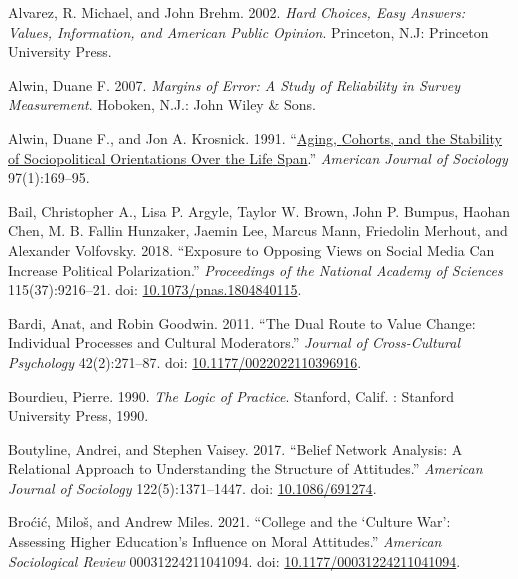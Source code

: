 \documentclass[
  11pt,
]{article}
\newlength{\cslhangindent}
\newlength{\cslentryspacingunit} %
\newenvironment{CSLReferences}[2] %
 {%
  \setlength{\parindent}{0pt}
  \ifodd #1
  \let\oldpar\par
  \def\par{\hangindent=\cslhangindent\oldpar}
  \fi
  \setlength{\parskip}{#2\cslentryspacingunit}
 }%
 {}
\begin{document}
\hypertarget{refs}{}
\begin{CSLReferences}{1}{0}
\leavevmode{}%
Alvarez, R. Michael, and John Brehm. 2002. \emph{Hard Choices, Easy
Answers: Values, Information, and {American} Public Opinion}. Princeton,
N.J: Princeton University Press.

\leavevmode{}%
Alwin, Duane F. 2007. \emph{Margins of {Error}: {A} {Study} of
{Reliability} in {Survey} {Measurement}}. Hoboken, N.J.: John Wiley \&
Sons.

\leavevmode{}%
Alwin, Duane F., and Jon A. Krosnick. 1991.
{``\href{https://www.jstor.org/stable/2781642}{Aging, {Cohorts}, and the
{Stability} of {Sociopolitical} {Orientations} {Over} the {Life}
{Span}}.''} \emph{American Journal of Sociology} 97(1):169--95.

\leavevmode{}%
Bail, Christopher A., Lisa P. Argyle, Taylor W. Brown, John P. Bumpus,
Haohan Chen, M. B. Fallin Hunzaker, Jaemin Lee, Marcus Mann, Friedolin
Merhout, and Alexander Volfovsky. 2018. {``Exposure to Opposing Views on
Social Media Can Increase Political Polarization.''} \emph{Proceedings
of the National Academy of Sciences} 115(37):9216--21. doi:
\href{https://doi.org/10.1073/pnas.1804840115}{10.1073/pnas.1804840115}.

\leavevmode{}%
Bardi, Anat, and Robin Goodwin. 2011. {``The {Dual} {Route} to {Value}
{Change}: {Individual} {Processes} and {Cultural} {Moderators}.''}
\emph{Journal of Cross-Cultural Psychology} 42(2):271--87. doi:
\href{https://doi.org/10.1177/0022022110396916}{10.1177/0022022110396916}.

\leavevmode{}%
Bourdieu, Pierre. 1990. \emph{The Logic of Practice}. Stanford, Calif. :
Stanford University Press, 1990.

\leavevmode{}%
Boutyline, Andrei, and Stephen Vaisey. 2017. {``Belief {Network}
{Analysis}: {A} {Relational} {Approach} to {Understanding} the
{Structure} of {Attitudes}.''} \emph{American Journal of Sociology}
122(5):1371--1447. doi:
\href{https://doi.org/10.1086/691274}{10.1086/691274}.

\leavevmode{}%
Broćić, Miloš, and Andrew Miles. 2021. {``College and the {`{Culture}
{War}'}: {Assessing} {Higher} {Education}'s {Influence} on {Moral}
{Attitudes}.''} \emph{American Sociological Review} 00031224211041094.
doi:
\href{https://doi.org/10.1177/00031224211041094}{10.1177/00031224211041094}.


\end{CSLReferences}
\end{document}
